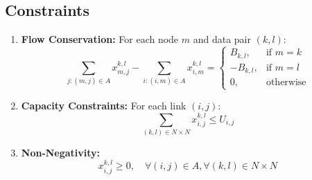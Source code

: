 \documentclass{article}
\begin{document}
\subsection*{Constraints}
\begin{enumerate}
    \item \textbf{Flow Conservation:} For each node \(m\) and data pair \((k, l)\):
    \[
    \sum_{j : (m, j) \in A} x_{m,j}^{k,l} - \sum_{i : (i, m) \in A} x_{i,m}^{k,l} =
    \begin{cases} 
    B_{k,l}, & \text{if } m = k \\
    -B_{k,l}, & \text{if } m = l \\
    0, & \text{otherwise}
    \end{cases}
    \]
    
    \item \textbf{Capacity Constraints:} For each link \((i, j)\):
    \[
    \sum_{(k,l) \in N \times N} x_{i,j}^{k,l} \leq U_{i,j}
    \]
    
    \item \textbf{Non-Negativity:} 
    \[
    x_{i,j}^{k,l} \geq 0, \quad \forall (i,j) \in A, \forall (k,l) \in N \times N
    \]
\end{enumerate}
\end{document}
